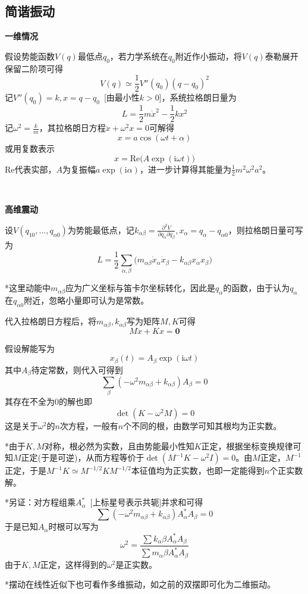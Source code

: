 \documentclass[a4paper,UTF8,fontset=windows]{ctexart}
\begin{document}
\subsection{简谐振动}
\textbf{一维情况}

假设势能函数$V(q)$最低点$q_0$，若力学系统在$q_0$附近作小振动，将$V(q)$泰勒展开保留二阶项可得
$$V(q)\simeq\frac{1}{2}V''(q_0)(q-q_0)^2$$
记$V''(q_0)=k,x=q-q_0$\ [由最小性$k>0$]，系统拉格朗日量为
$$L=\frac{1}{2}m\dot{x}^2-\frac{1}{2}kx^2$$
记$\omega^2=\frac{k}{m}$，其拉格朗日方程$\ddot{x}+\omega^2x=0$可解得
$$x=a\cos(\omega t+\alpha)$$
或用复数表示
$$x=\mathrm{Re}\big(A\exp(\mathrm{i}\omega t)\big)$$
$\mathrm{Re}$代表实部，$A$为复振幅$a\exp(\mathrm{i}\alpha)$，进一步计算得其能量为$\frac{1}{2}m^2\omega^2a^2$。

\

\textbf{高维震动}

设$V(q_{10},\dots,q_{\alpha0})$为势能最低点，记$k_{\alpha\beta}=\frac{\partial^2V}{\partial q_\alpha\partial q_\beta},x_\alpha=q_\alpha-q_{\alpha 0}$，则拉格朗日量可写为
$$L=\frac{1}{2}\sum_{\alpha,\beta}\big(m_{\alpha\beta}\dot{x}_\alpha\dot{x}_\beta-k_{\alpha\beta}x_\alpha x_\beta\big)$$

*这里动能中$m_{\alpha\beta}$应为广义坐标与笛卡尔坐标转化，因此是$q_\alpha$的函数，由于认为$q_\alpha$在$q_{\alpha0}$附近，忽略小量即可认为是常数。

代入拉格朗日方程后，将$m_{\alpha\beta},k_{\alpha\beta}$写为矩阵$M,K$可得
$$M\ddot{x}+Kx=\mathbf{0}$$

假设解能写为
$$x_\beta(t)=A_\beta\exp(\mathrm{i}\omega t)$$
其中$A_\beta$待定常数，则代入可得到
$$\sum_\beta(-\omega^2m_{\alpha\beta}+k_{\alpha\beta})A_\beta=0$$
其存在不全为0的解也即
$$\det(K-\omega^2M)=0$$
这是关于$\omega^2$的$n$次方程，一般有$n$个不同的根，由数学可知其根均为正实数。

*由于$K,M$对称，根必然为实数，且由势能最小性知$K$正定，根据坐标变换规律可知$M$正定(于是可逆)，从而方程等价于$\det(M^{-1}K-\omega^2I)=0$。由$M$正定，$M^{-1}$正定，于是$M^{-1}K\simeq M^{-1/2}KM^{-1/2}$本征值均为正实数，也即一定能得到$n$个正实数解。

*另证：对方程组乘$A_\alpha^*$\ [上标星号表示共轭]并求和可得
$$\sum(-\omega^2m_{\alpha\beta}+k_{\alpha\beta})A_\alpha^*A_\beta=0$$
于是已知$A_\alpha$时根可以写为
$$\omega^2=\frac{\sum k_\alpha\beta A_\alpha^*A_\beta}{\sum m_\alpha\beta A_\alpha^*A_\beta}$$
由于$K,M$正定，这样得到的$\omega^2$是正实数。

*摆动在线性近似下也可看作多维振动，如之前的双摆即可化为二维振动。
\end{document}
